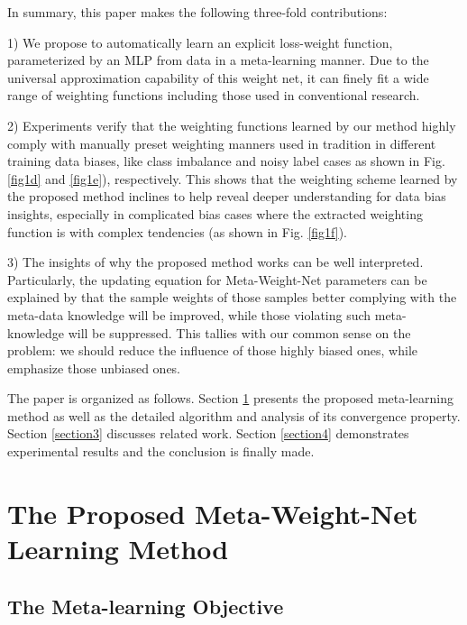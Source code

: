 \documentclass{article}
\begin{document}
	In summary, this paper makes the following three-fold contributions:\vspace{0mm}
	
	1) We propose to automatically learn an explicit loss-weight function, parameterized by an MLP from data in a meta-learning manner. Due to the universal approximation capability of this weight net, it can finely fit a wide range of weighting functions including those used in conventional research.\vspace{0mm}
	
	2) Experiments verify that the weighting functions learned by our method highly comply with manually preset weighting manners used in tradition in different training data biases, like class imbalance and noisy label cases as shown in Fig. \ref{fig1d} and \ref{fig1e}), respectively. This shows that the weighting scheme learned by the proposed method inclines to help reveal deeper understanding for data bias insights, especially in complicated bias cases where the extracted weighting function is with complex tendencies (as shown in Fig. \ref{fig1f}).\vspace{0mm}
	
	3) The insights of why the proposed method works can be well interpreted. Particularly, the updating equation for Meta-Weight-Net parameters can be explained by that the sample weights of those samples better complying with the meta-data knowledge will be improved, while those violating such meta-knowledge will be suppressed. This tallies with our common sense on the problem: we should reduce the influence of those highly biased ones, while emphasize those unbiased ones.
	
	The paper is organized as follows. Section \ref{section2} presents the proposed meta-learning method as well as the detailed algorithm and analysis of its convergence property. Section \ref{section3} discusses related work. Section \ref{section4} demonstrates experimental results and the conclusion is finally made.\vspace{0mm}
	
	
	
	\section{The Proposed Meta-Weight-Net Learning Method}\label{section2}


\subsection{The Meta-learning Objective}\vspace{-1mm}
	
\end{document}
